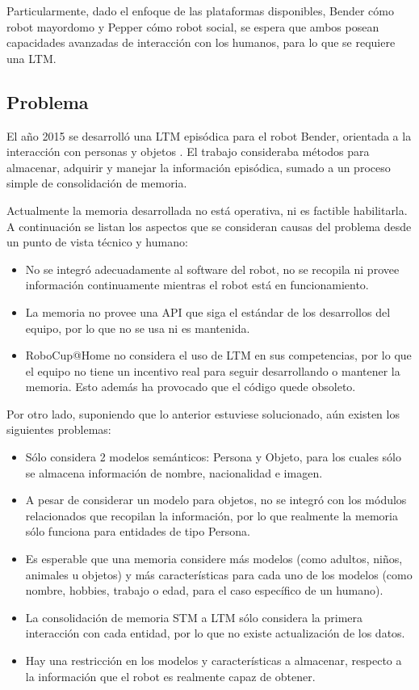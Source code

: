 Particularmente, dado el enfoque de las plataformas disponibles, Bender cómo robot mayordomo y Pepper cómo robot social, se espera que ambos posean capacidades avanzadas de interacción con los humanos, para lo que se requiere una LTM.


\subsection{Problema}

El año 2015 se desarrolló una LTM episódica para el robot Bender, orientada a la interacción con personas y objetos \cite{Sanchez:2015}. El trabajo consideraba métodos para almacenar, adquirir y manejar la información episódica, sumado a un proceso simple de consolidación de memoria.

Actualmente la memoria desarrollada no está operativa, ni es factible habilitarla. A continuación se listan los aspectos que se consideran causas del problema desde un punto de vista técnico y humano:
\begin{itemize}
	\item No se integró adecuadamente al software del robot, no se recopila ni provee información continuamente mientras el robot está en funcionamiento.
	\item La memoria no provee una API que siga el estándar de los desarrollos del equipo, por lo que no se usa ni es mantenida.
	\item RoboCup@Home no considera el uso de LTM en sus competencias, por lo que el equipo no tiene un incentivo real para seguir desarrollando o mantener la memoria. Esto además ha provocado que el código quede obsoleto.
\end{itemize}

Por otro lado, suponiendo que lo anterior estuviese solucionado, aún existen los siguientes problemas:
\begin{itemize}
	\item Sólo considera 2 modelos semánticos: Persona y Objeto, para los cuales sólo se almacena información de nombre, nacionalidad e imagen.
	\item A pesar de considerar un modelo para objetos, no se integró con los módulos relacionados que recopilan la información, por lo que realmente la memoria sólo funciona para entidades de tipo Persona.
	\item Es esperable que una memoria considere más modelos (como adultos, niños, animales u objetos) y más características para cada uno de los modelos (como nombre, hobbies, trabajo o edad, para el caso específico de un humano).
	\item La consolidación de memoria STM a LTM sólo considera la primera interacción con cada entidad, por lo que no existe actualización de los datos.
	\item Hay una restricción en los modelos y características a almacenar, respecto a la información que el robot es realmente capaz de obtener.
\end{itemize}



